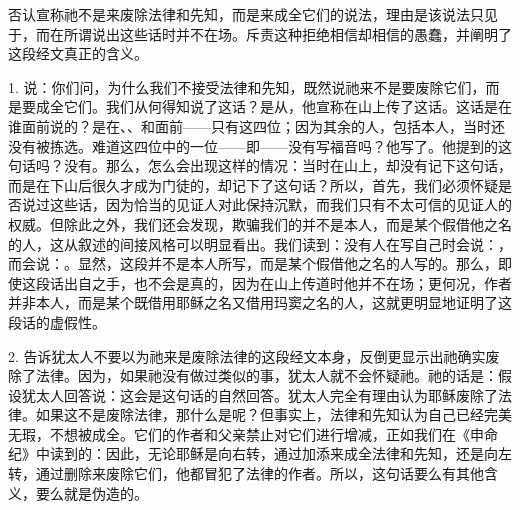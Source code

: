 否认宣称祂不是来废除法律和先知，而是来成全它们的说法，理由是该说法只见于，而在所谓说出这些话时并不在场。斥责这种拒绝相信却相信的愚蠢，并阐明了这段经文真正的含义。\par

1. 说：你们问，为什么我们不接受法律和先知，既然说祂来不是要废除它们，而是要成全它们。我们从何得知说了这话？是从，他宣称在山上传了这话。这话是在谁面前说的？是在、、和面前——只有这四位；因为其余的人，包括本人，当时还没有被拣选。难道这四位中的一位——即——没有写福音吗？他写了。他提到的这句话吗？没有。那么，怎么会出现这样的情况：当时在山上，却没有记下这句话，而是在下山后很久才成为门徒的，却记下了这句话？所以，首先，我们必须怀疑是否说过这些话，因为恰当的见证人对此保持沉默，而我们只有不太可信的见证人的权威。但除此之外，我们还会发现，欺骗我们的并不是本人，而是某个假借他之名的人，这从叙述的间接风格可以明显看出。我们读到：没有人在写自己时会说：，而会说：。显然，这段并不是本人所写，而是某个假借他之名的人写的。那么，即使这段话出自之手，也不会是真的，因为在山上传道时他并不在场；更何况，作者并非本人，而是某个既借用耶稣之名又借用玛窦之名的人，这就更明显地证明了这段话的虚假性。\par

2. 告诉犹太人不要以为祂来是废除法律的这段经文本身，反倒更显示出祂确实废除了法律。因为，如果祂没有做过类似的事，犹太人就不会怀疑祂。祂的话是：假设犹太人回答说：这会是这句话的自然回答。犹太人完全有理由认为耶稣废除了法律。如果这不是废除法律，那什么是呢？但事实上，法律和先知认为自己已经完美无瑕，不想被成全。它们的作者和父亲禁止对它们进行增减，正如我们在《申命纪》中读到的：因此，无论耶稣是向右转，通过加添来成全法律和先知，还是向左转，通过删除来废除它们，他都冒犯了法律的作者。所以，这句话要么有其他含义，要么就是伪造的。\par

